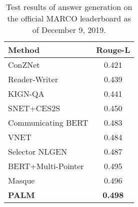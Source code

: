 \documentclass[11pt,a4paper]{article}
\newcommand{\method}{PALM\xspace}
\begin{document}
\begin{table}[t]
\center
\begin{tabular}{ l | c}
\hline\hline
\textbf{Method} & \textbf{Rouge-L}\\
\hline\hline
ConZNet~\cite{Indurthi:2018} & 0.421\\
\hline
Reader-Writer & 0.439\\
\hline
KIGN-QA & 0.441\\
\hline
SNET+CES2S & 0.450\\
\hline
Communicating BERT & 0.483\\
\hline
VNET~\cite{VNET2018} & 0.484\\
\hline
Selector NLGEN & 0.487\\
\hline
BERT+Multi-Pointer & 0.495\\
\hline
Masque~\cite{Nishida:2019} & 0.496\\
\hline
\textbf{\method} & \textbf{0.498}\\
\hline\hline
\end{tabular}
\caption{Test results of answer generation on the official MARCO leaderboard as of December 9, 2019.}
\label{table:marco}
\vspace{-10pt}
\end{table}
\end{document}
